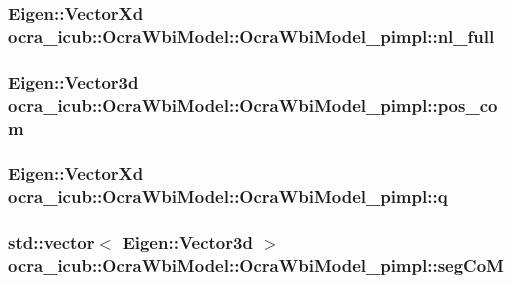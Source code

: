 \hypertarget{structOcraWbiModel_1_1OcraWbiModel__pimpl_abea2880fe7e4fa2672ce55635ab9ea6c}{
\subsubsection[{nl\-\_\-full}]{\setlength{\rightskip}{0pt plus 5cm}\-Eigen\-::\-Vector\-Xd {\bf ocra\-\_\-icub\-::\-Ocra\-Wbi\-Model\-::\-Ocra\-Wbi\-Model\-\_\-pimpl\-::nl\-\_\-full}}}\label{structOcraWbiModel_1_1OcraWbiModel__pimpl_abea2880fe7e4fa2672ce55635ab9ea6c}
\hypertarget{structOcraWbiModel_1_1OcraWbiModel__pimpl_acc028d57a70c3b36838f28ea518f65c4}{
\subsubsection[{pos\-\_\-com}]{\setlength{\rightskip}{0pt plus 5cm}\-Eigen\-::\-Vector3d {\bf ocra\-\_\-icub\-::\-Ocra\-Wbi\-Model\-::\-Ocra\-Wbi\-Model\-\_\-pimpl\-::pos\-\_\-com}}}\label{structOcraWbiModel_1_1OcraWbiModel__pimpl_acc028d57a70c3b36838f28ea518f65c4}
\hypertarget{structOcraWbiModel_1_1OcraWbiModel__pimpl_a1f83373b2d975e1882ee7812215df997}{
\subsubsection[{q}]{\setlength{\rightskip}{0pt plus 5cm}\-Eigen\-::\-Vector\-Xd {\bf ocra\-\_\-icub\-::\-Ocra\-Wbi\-Model\-::\-Ocra\-Wbi\-Model\-\_\-pimpl\-::q}}}\label{structOcraWbiModel_1_1OcraWbiModel__pimpl_a1f83373b2d975e1882ee7812215df997}
\hypertarget{structOcraWbiModel_1_1OcraWbiModel__pimpl_af244a33c7309714ca793d29247ead8b8}{
\subsubsection[{seg\-Co\-M}]{\setlength{\rightskip}{0pt plus 5cm}std\-::vector$<$ \-Eigen\-::\-Vector3d $>$ {\bf ocra\-\_\-icub\-::\-Ocra\-Wbi\-Model\-::\-Ocra\-Wbi\-Model\-\_\-pimpl\-::seg\-Co\-M}}}\label{structOcraWbiModel_1_1OcraWbiModel__pimpl_af244a33c7309714ca793d29247ead8b8}
